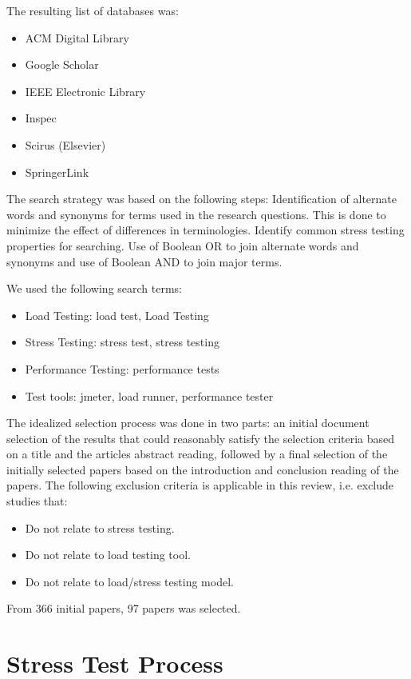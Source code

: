 \documentclass[espaco=umemeio,chapter=TITLE,twoside,openright]{abnt}
\begin{document}
The resulting list of databases was:

\begin{itemize}
\item  ACM Digital Library
\item  Google Scholar
\item  IEEE Electronic Library
\item  Inspec
\item  Scirus (Elsevier)
\item SpringerLink
\end{itemize}


The search strategy was based on the following steps:  Identification of alternate words and synonyms for terms used
in the research questions. This is done to minimize the effect
of differences in terminologies. Identify common stress testing properties for searching.  Use of Boolean OR to join alternate words and synonyms and use of Boolean AND to join major terms.

We used the following search terms:

\begin{itemize}
\item Load Testing: load test, Load Testing
\item Stress Testing: stress test, stress testing
\item Performance Testing: performance tests
\item Test tools: jmeter, load runner, performance tester
\end{itemize}



The idealized selection process was done in two parts: an initial document selection of the results that could reasonably satisfy the selection criteria based on a title and the articles abstract reading, followed by a final selection of the initially selected papers based on the introduction and conclusion reading of the papers. The following exclusion criteria is applicable in this review, i.e. exclude studies that:
\begin{itemize}
\item Do not relate to stress testing.
\item Do not relate to load testing tool.
\item Do not relate to load/stress testing model.
\end{itemize}

From 366 initial papers, 97 papers was selected.


\section{Stress Test Process}
\end{document}
